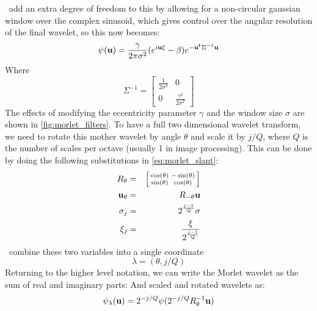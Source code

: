   \Mallat\ add an extra degree of freedom to this by allowing for a non-circular
  gaussian window over the complex sinusoid, which gives control over the angular
  resolution of the final wavelet, so this now becomes:
  \begin{equation}
    \psi(\mathbf{u}) = \frac{\gamma}{2\pi\sigma^2}{(e^{i\mathbf{u}\xi} - \beta)}
                  e^{-\mathbf{u^t}\Sigma^{-1}  \mathbf{u}} 
    \label{eq:morlet_slant}
  \end{equation}
  Where
  $$\Sigma^{-1} = \left[ \begin{smallmatrix} 
      \frac{1}{2\sigma^2} & 0 \\ 
      0 & \frac{\gamma^2}{2\sigma^2} 
      \end{smallmatrix} \right] $$
  The effects of modifying the eccentricity parameter $\gamma$ and the window size
  $\sigma$ are shown in \autoref{fig:morlet_filters}. To have a full two
  dimensional wavelet transform, we need to rotate this mother wavelet by angle
  $\theta$ and scale it by $j/Q$, where $Q$ is the number of scales per octave
  (usually 1 in image processing). 
  This can be done by doing the following
  substitutions in \autoref{eq:morlet_slant}:
  \begin{eqnarray*}
    R_{\theta}& = &\left[ \begin{smallmatrix}
                    \cos(\theta) & -\sin(\theta) \\
                    \sin(\theta) & \cos(\theta)
                  \end{smallmatrix} \right] \\
    \mathbf{u}_{\theta} & = & R_{-\theta} \mathbf{u} \\
    \sigma_j & = & 2^{\frac{j-1}{Q}} \sigma \\
    \xi_j & = & \frac{\xi}{2^{\frac{j-1}{Q}}}
  \end{eqnarray*}
  \Mallat\ combine these two variables into a single coordinate
  \begin{equation}
    \lambda = (\theta, j/Q)
  \end{equation}
  Returning to the higher level notation, we can write
  the Morlet wavelet as the sum of real and imaginary parts: And scaled and
  rotated wavelets as:
  \begin{equation}
    \psi_{\lambda}(\mathbf{u}) = 2^{-j/Q}\psi(2^{-j/Q}R_{\theta}^{-1} \mathbf{u})
  \end{equation}
